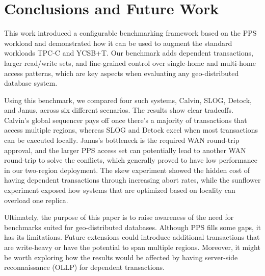 \section{Conclusions and Future Work}
\label{sec: conclusion-and-future-work}

This work introduced a configurable benchmarking framework based on the PPS workload and demonstrated how it can be used to augment the standard workloads TPC-C and YCSB+T. Our benchmark adds dependent transactions, larger read/write sets, and fine-grained control over single-home and multi-home access patterns, which are key aspects when evaluating any geo-distributed database system. 

Using this benchmark, we compared four such systems, Calvin, SLOG, Detock, and Janus, across six different scenarios. The results show clear tradeoffs. Calvin's global sequencer pays off once there's a majority of transactions that access multiple regions, whereas SLOG and Detock excel when most transactions can be executed locally. Janus's bottleneck is the required WAN round-trip approval, and the larger PPS access set can potentially lead to another WAN round-trip to solve the conflicts, which generally proved to have low performance in our two-region deployment. The skew experiment showed the hidden cost of having dependent transactions through increasing abort rates, while the sunflower experiment exposed how systems that are optimized based on locality can overload one replica.

Ultimately, the purpose of this paper is to raise awareness of the need for benchmarks suited for geo-distributed databases. Although PPS fills some gaps, it has its limitations. Future extensions could introduce additional transactions that are write-heavy or have the potential to span multiple regions. Moreover, it might be worth exploring how the results would be affected by having server-side reconnaissance (OLLP) for dependent transactions.
